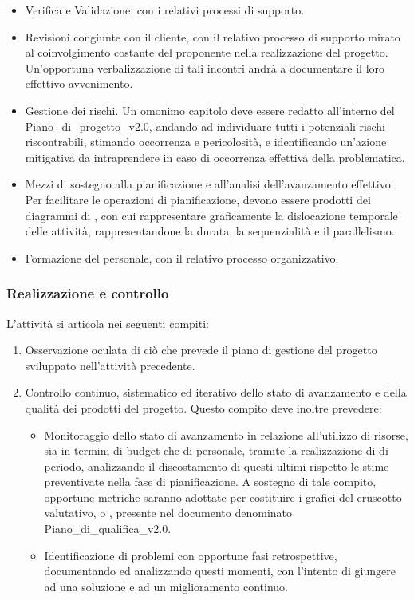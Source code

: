 \begin{enumerate}
\begin{itemize}
        \item Verifica e Validazione, con i relativi processi di supporto.
        \item Revisioni congiunte con il cliente, con il relativo processo di supporto mirato al coinvolgimento costante del proponente nella realizzazione del progetto. Un'opportuna verbalizzazione di tali incontri andrà a documentare il loro effettivo avvenimento.
        \item Gestione dei rischi. Un omonimo capitolo deve essere redatto all'interno del Piano\_di\_progetto\_v2.0, andando ad individuare tutti i potenziali rischi riscontrabili, stimando occorrenza e pericolosità, e identificando un'azione mitigativa da intraprendere in caso di occorrenza effettiva della problematica.
        \item Mezzi di sostegno alla pianificazione e all'analisi dell'avanzamento effettivo. Per facilitare le operazioni di pianificazione, devono essere prodotti dei diagrammi di , con cui rappresentare graficamente la dislocazione temporale delle attività, rappresentandone la durata, la sequenzialità e il parallelismo.
        \item Formazione del personale, con il relativo processo organizzativo.
    \end{itemize}
\end{enumerate}

\subsubsection{Realizzazione e controllo}
L'attività si articola nei seguenti compiti:
\begin{enumerate}
    \item Osservazione oculata di ciò che prevede il piano di gestione del progetto sviluppato nell'attività precedente.
    \item Controllo continuo, sistematico ed iterativo dello stato di avanzamento e della qualità dei prodotti del progetto. Questo compito deve inoltre prevedere:
    \begin{itemize}
        \item Monitoraggio dello stato di avanzamento in relazione all'utilizzo di risorse, sia in termini di budget che di personale, tramite la realizzazione di  di periodo, analizzando il discostamento di questi ultimi rispetto le stime preventivate nella fase di pianificazione. A sostegno di tale compito, opportune metriche saranno adottate per costituire i grafici del cruscotto valutativo, o , presente nel documento denominato Piano\_di\_qualifica\_v2.0.
        \item Identificazione di problemi con opportune fasi retrospettive, documentando ed analizzando questi momenti, con l'intento di giungere ad una soluzione e ad un miglioramento continuo.
    \end{itemize}
\end{enumerate}

